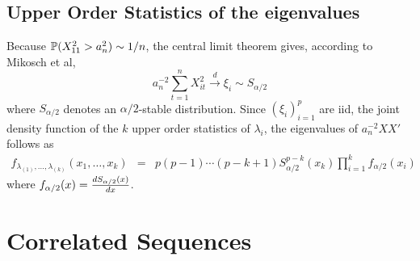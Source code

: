 \documentclass{article}
\begin{document}
\subsection{Upper Order Statistics of the eigenvalues}
Because $\mathbb{P}(X_{11}^2 > a_n^2) \sim 1/n$, the central limit theorem
gives, according to Mikosch et al\cite{Embrechts1997},
\[
a_n^{-2} \sum_{t=1}^n X_{it}^2 \xrightarrow{d} \xi_i \sim S_{\alpha/2}
\]
where $S_{\alpha/2}$ denotes an $\alpha/2$-stable distribution. Since
$(\xi_i)_{i=1}^p$ are iid, the joint density function of the $k$ upper
order statistics of $\lambda_i$, the eigenvalues of $a_n^{-2} X X'$
follows as
\begin{eqnarray*}
  f_{\lambda_{(1)}, \dots, \lambda_{(k)}}(x_1, \dots, x_k) &=&
  p(p-1)\cdots(p-k+1) S_{\alpha/2}^{p-k}(x_k) \prod_{i=1}^k
  f_{\alpha/2}(x_i)
\end{eqnarray*}
where $f_{\alpha/2}(x) = {d S_{\alpha/2}(x) \over dx}$.


% 
\section{Correlated Sequences}
\end{document}
